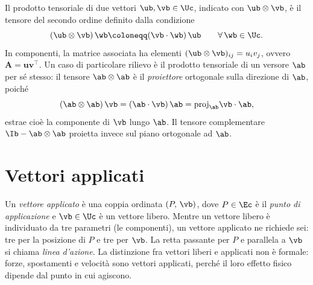 Il prodotto tensoriale di due vettori $\ub, \vb \in \Uc$, indicato con
$\ub \otimes \vb$, è il tensore del secondo ordine definito dalla
condizione
\begin{equation}
	(\ub \otimes \vb)\,\wb \coloneqq (\vb \cdot \wb)\,\ub
	\qquad \forall\,\wb \in \Uc.
\end{equation}
In componenti, la matrice associata ha elementi
$(\ub \otimes \vb)_{ij} = u_i v_j$, ovvero $\bm{A} = \bm{u}\bm{v}^\top$.
Un caso di particolare rilievo è il prodotto tensoriale di un versore
$\ab$ per sé stesso: il tensore $\ab \otimes \ab$ è il
\textit{proiettore} ortogonale sulla direzione di $\ab$, poiché
\begin{equation}
	(\ab \otimes \ab)\,\vb = (\ab \cdot \vb)\,\ab = \mathrm{proj}_{\ab}\vb\cdot\ab,
\end{equation}
estrae cioè la componente di $\vb$ lungo $\ab$. Il tensore complementare
$\Ib - \ab \otimes \ab$ proietta invece sul piano ortogonale ad $\ab$.



\section{Vettori applicati}\label{sec:vettori_applicati}

Un \textit{vettore applicato} è una coppia ordinata $(P,\,\vb)$, dove
$P \in \Ec$ è il \textit{punto di applicazione} e $\vb \in \Uc$ è un
vettore libero. Mentre un vettore libero è individuato da tre parametri
(le componenti), un vettore applicato ne richiede sei: tre per la
posizione di $P$ e tre per $\vb$. La retta passante per $P$ e parallela
a $\vb$ si chiama \textit{linea d'azione}. La distinzione fra vettori
liberi e applicati non è formale: forze, spostamenti e velocità sono
vettori applicati, perché il loro effetto fisico dipende dal punto in
cui agiscono.


